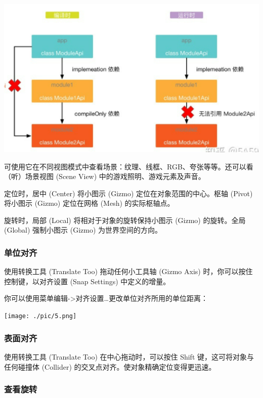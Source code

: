 \documentclass[9pt, b5paper]{article}
\begin{document}
\begin{center}
\includegraphics[width=.9\linewidth]{./pic/4.png}
\end{center}
可使用它在不同视图模式中查看场景：纹理、线框、RGB、夸张等等。还可以看（听）场景视图 (Scene View) 中的游戏照明、游戏元素及声音。

定位时，居中 (Center) 将小图示 (Gizmo) 定位在对象范围的中心。枢轴 (Pivot) 将小图示 (Gizmo) 定位在网格 (Mesh) 的实际枢轴点。

旋转时，局部 (Local) 将相对于对象的旋转保持小图示 (Gizmo) 的旋转。全局 (Global) 强制小图示 (Gizmo) 为世界空间的方向。

\subsubsection{单位对齐}
\label{sec:org32fc269}

使用转换工具 (Translate Too) 拖动任何小工具轴 (Gizmo Axis) 时，你可以按住控制键，以对齐设置 (Snap Settings) 中定义的增量。

你可以使用菜单编辑->对齐设置\ldots{}更改单位对齐所用的单位距离：

\begin{center}
\texttt{[image: ./pic/5.png]}
\end{center}

\subsubsection{表面对齐}
\label{sec:orgb0ed2a5}

使用转换工具 (Translate Too) 在中心拖动时，可以按住 Shift 键，这可将对象与任何碰撞体 (Collider) 的交叉点对齐。使对象精确定位变得更迅速。

\subsubsection{查看旋转}
\label{sec:orgadd4fd8}
\end{document}
